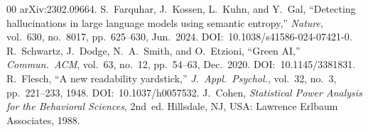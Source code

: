 \documentclass[conference]{IEEEtran}
\begin{document}
\begin{thebibliography}{00}
arXiv:2302.09664.
S.~Farquhar, J.~Kossen, L.~Kuhn, and Y.~Gal,
``Detecting hallucinations in large language models using
semantic entropy,''
\textit{Nature}, vol.~630, no.~8017, pp.~625--630, Jun.~2024.
DOI:~10.1038/s41586-024-07421-0.
R.~Schwartz, J.~Dodge, N.~A.~Smith, and O.~Etzioni,
``Green AI,''
\textit{Commun.\ ACM}, vol.~63, no.~12, pp.~54--63, Dec.~2020.
DOI:~10.1145/3381831.
R.~Flesch,
``A new readability yardstick,''
\textit{J.~Appl.\ Psychol.}, vol.~32, no.~3, pp.~221--233,
1948.
DOI:~10.1037/h0057532.
J.~Cohen,
\textit{Statistical Power Analysis for the Behavioral Sciences},
2nd~ed. Hillsdale, NJ, USA: Lawrence Erlbaum Associates, 1988.
\end{thebibliography}
\end{document}
